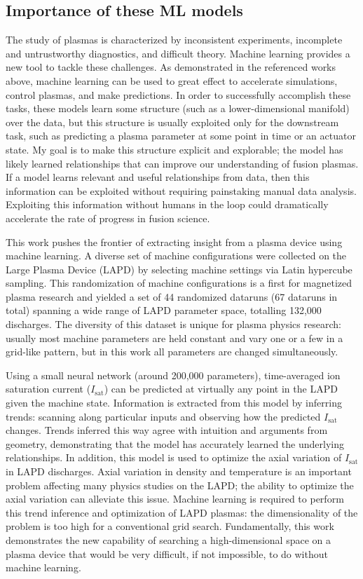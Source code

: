 \subsection{Importance of these ML models}

The study of plasmas is characterized by inconsistent experiments, incomplete and untrustworthy diagnostics, and difficult theory. Machine learning provides a new tool to tackle these challenges. As demonstrated in the referenced works above, machine learning can be used to great effect to accelerate simulations, control plasmas, and make predictions. In order to successfully accomplish these tasks, these models learn some structure (such as a lower-dimensional manifold) over the data, but this structure is usually exploited only for the downstream task, such as predicting a plasma parameter at some point in time or an actuator state. My goal is to make this structure explicit and explorable; the model has likely learned relationships that can improve our understanding of fusion plasmas. If a model learns relevant and useful relationships from data, then this information can be exploited without requiring painstaking manual data analysis. Exploiting this information without humans in the loop could dramatically accelerate the rate of progress in fusion science.

This work pushes the frontier of extracting insight from a plasma device using machine learning. A diverse set of machine configurations were collected on the Large Plasma Device (LAPD) by selecting machine settings via Latin hypercube sampling. This randomization of machine configurations is a first for magnetized plasma research and yielded a set of 44 randomized dataruns (67 dataruns in total) spanning a wide range of LAPD parameter space, totalling 132,000 discharges. The diversity of this dataset is unique for plasma physics research: usually most machine parameters are held constant and vary one or a few in a grid-like pattern, but in this work all parameters are changed simultaneously. 

Using a small neural network (around 200,000 parameters), time-averaged ion saturation current ($I_\text{sat}$) can be predicted at virtually any point in the LAPD given the machine state. Information is extracted from this model by inferring trends: scanning along particular inputs and observing how the predicted $I_\text{sat}$ changes. Trends inferred this way agree with intuition and arguments from geometry, demonstrating that the model has accurately learned the underlying relationships. In addition, this model is used to optimize the axial variation of $I_\text{sat}$ in LAPD discharges. Axial variation in density and temperature is an important problem affecting many physics studies on the LAPD; the ability to optimize the axial variation can alleviate this issue. Machine learning is required to perform this trend inference and optimization of LAPD plasmas: the dimensionality of the problem is too high for a conventional grid search. Fundamentally, this work demonstrates the new capability of searching a high-dimensional space on a plasma device that would be very difficult, if not impossible, to do without machine learning.

